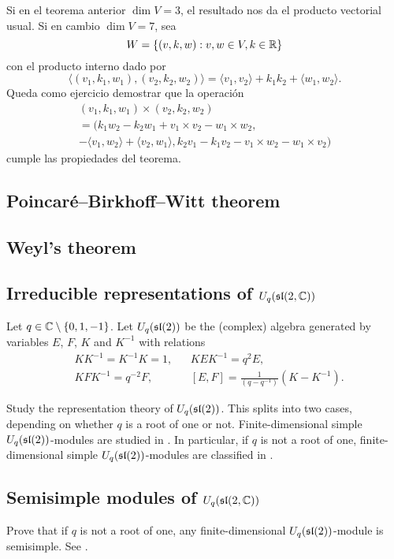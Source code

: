 Si en el teorema anterior $\dim V=3$, el resultado nos da el producto vectorial usual. Si en cambio $\dim V=7$, 
sea 
\[
	W=\{(v,k,w):v,w\in V,k\in\R\}
\]
con el producto interno dado por
\[
	\langle (v_1,k_1,w_1),(v_2,k_2,w_2)\rangle = \langle v_1,v_2\rangle+k_1k_2+\langle w_1,w_2\rangle.
\]
Queda como ejercicio demostrar que la operación
\begin{multline*}
	(v_1,k_1,w_1)\times (v_2,k_2,w_2)\\
	=(k_1w_2-k_2w_1+v_1\times v_2-w_1\times w_2,
	\\-\langle v_1,w_2\rangle+\langle v_2,w_1\rangle, 
	k_2v_1-k_1v_2-v_1\times w_2-w_1\times v_2)
\end{multline*}
cumple las propiedades del teorema.

\subsection*{Poincar\'e--Birkhoff--Witt theorem}

\subsection*{Weyl's theorem}

\subsection*{Irreducible representations of $U_q(\sl(2,\C))$}

Let $q\in\C\setminus\{0,1,-1\}$. 
Let $U_q(\sl(2))$ be the (complex) algebra generated by 
variables $E$, $F$, $K$ and $K^{-1}$ with relations
\begin{align*}
    &KK^{-1}=K^{-1}K=1,
    &&
    KEK^{-1}=q^2E,\\
    &
    KFK^{-1}=q^{-2}F,
    &&
    [E,F]=\frac{1}{(q-q^{-1})}(K-K^{-1}).
\end{align*}

Study the representation theory of $U_q(\sl(2))$. This splits into
two cases, depending on whether $q$ is a root of one or not. 
Finite-dimensional simple $U_q(\sl(2))$-modules are studied 
in \cite[VI]{MR1321145}. In particular, if 
$q$ is not a root of one, finite-dimensional simple $U_q(\sl(2))$-modules
are classified in \cite[Theorem VI.3.5]{MR1321145}. 

\subsection*{Semisimple modules of $U_q(\sl(2,\C))$}

Prove that if $q$ is not a root of one, any finite-dimensional
$U_q(\sl(2))$-module is semisimple. 
See \cite[Theorem VII.2.2]{MR1321145}. 